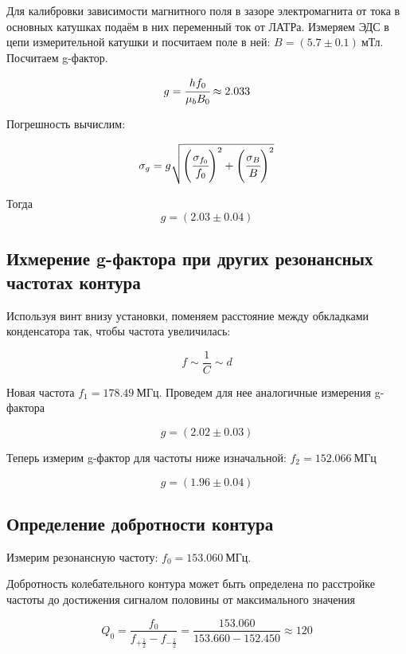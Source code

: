 \documentclass[a4paper,12pt]{article}
\begin{document}
Для калибровки зависимости магнитного поля в зазоре электромагнита от тока в основных катушках подаём в них переменный ток от ЛАТРа. Измеряем ЭДС в цепи измерительной катушки и посчитаем поле в ней: $B = (5{.}7 \pm 0{.}1)~\text{мТл}$. Посчитаем g-фактор.

\[
    g= \cfrac{h f_0}{\mu_b B_0} \approx 2.033
\]

Погрешность вычислим:

\[
    \sigma_g = g\sqrt{\left( \cfrac{\sigma_{f_0}}{f_0} \right)^2 + \left( \cfrac{\sigma_{B}}{B} \right)^2}
\]

Тогда
\[
    g= (2{.}03 \pm 0{.}04)
\]

\subsection*{Ихмерение g-фактора при других резонансных частотах контура}

Используя винт внизу установки, поменяем расстояние между обкладками конденсатора так, чтобы частота увеличилась:

\[
    f \sim \frac{1}{C} \sim d 
\]

Новая частота $f_1 = 178{.}49~\text{МГц}$. Проведем для нее аналогичные измерения g-фактора

\[
    g= (2{.}02 \pm 0{.}03)
\]

Теперь измерим g-фактор для частоты ниже изначальной: $f_2 = 152.066~\text{МГц}$

\[
    g= (1{.}96 \pm 0{.}04)
\]

\subsection*{Определение добротности контура}

Измерим резонансную частоту: $f_0 = 153{.}060~\text{МГц}$. 

Добротность колебательного контура может быть определена по расстройке частоты до достижения сигналом половины от максимального значения

\[
    Q_0 = \frac{f_0}{f_{+ \frac{1}{2}} - f_{- \frac{1}{2}}} = \frac{153{.}060}{153{.}660 - 152{.}450} \approx 120
\]


\FloatBarrier
\end{document}
